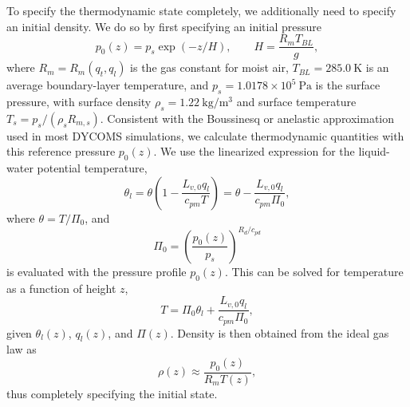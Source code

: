 \documentclass{report}
\begin{document}
{To specify the thermodynamic state completely, we additionally need to specify an initial density. We do so by first specifying an initial pressure
\[
p_0(z) = p_{s} \exp(-z/H), \qquad H = \frac{R_m T_{BL}}{g},
\]
where $R_m = R_m(q_t, q_l)$ is the gas constant for moist air, $T_{BL} = 285.0~\mathrm{K}$ is an average boundary-layer temperature, and $p_s = 1.0178\times 10^{5}~\mathrm{Pa}$ is the surface pressure, with surface density $\rho_s = 1.22~\mathrm{kg/m^3}$ and surface temperature $T_s = p_s/(\rho_s R_{m,s})$. Consistent with the Boussinesq or anelastic approximation used in most DYCOMS simulations, we calculate thermodynamic quantities with this reference pressure $p_0(z)$. We use the linearized expression for the liquid-water potential temperature,
\begin{equation}
    \label{eq:betts1973}
    \theta_l = \theta \left(1 - \frac{L_{v,0} q_l}{c_{pm} T} \right) = \theta - \frac{L_{v,0} q_l}{c_{pm} \Pi_0},
\end{equation}
where $\theta = T/\Pi_0$, and 
\[
\Pi_0 = \left( \frac{p_0(z)}{p_{s}} \right)^{R_d/c_{pd}}
\]
is evaluated with the pressure profile $p_0(z)$. This can be solved for temperature as a function of height $z$,
\[
T = \Pi_0 \theta_l + \frac{L_{v,0} q_l}{c_{pm} \Pi_0},
\]
given $\theta_l(z)$, $q_l(z)$, and $\Pi(z)$. Density is then obtained from the ideal gas law as
\[
\rho(z) \approx \frac{p_0(z)}{R_m T(z)},
\]
thus completely specifying the initial state. 

}
\end{document}
